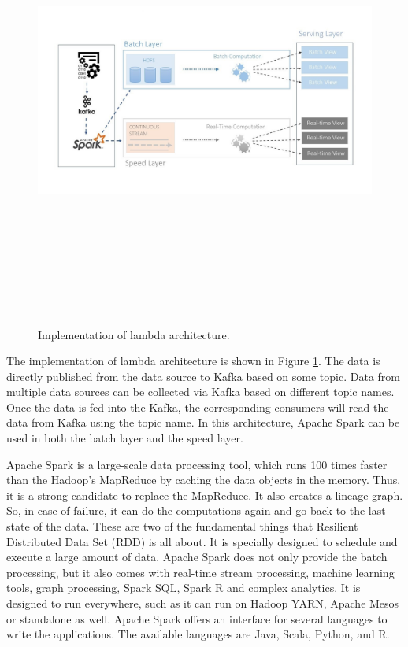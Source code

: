 \begin{figure}[htpb]
	\centering
	\includegraphics[width=17cm,height=15cm,keepaspectratio=true]{images/imp_lambda_arc}
	\caption{
		Implementation of lambda architecture.
	}
	\label{fig:impl_lambda_arc}
\end{figure}


The implementation of lambda architecture is shown in Figure \ref{fig:impl_lambda_arc}. The data is directly published from the data source to Kafka based on some topic. Data from multiple data sources can be collected via Kafka based on different topic names. Once the data is fed into the Kafka, the corresponding consumers will read the data from Kafka using the topic name. In this architecture, Apache Spark can be used in both the batch layer and the speed layer. 

Apache Spark is a large-scale data processing tool, which runs 100 times faster than the Hadoop's MapReduce by caching the data objects in the memory. Thus, it is a strong candidate to replace the MapReduce. It also creates a lineage graph. So, in case of failure, it can do the computations again and go back to the last state of the data. These are two of the fundamental things that Resilient Distributed Data Set (RDD) is all about. It is specially designed to schedule and execute a large amount of data. Apache Spark does not only provide the batch processing, but it also comes with real-time stream processing, machine learning tools, graph processing, Spark SQL, Spark R and complex analytics. It is designed to run everywhere, such as it can run on Hadoop YARN, Apache Mesos or standalone as well. Apache Spark offers an interface for several languages to write the applications. The available languages are Java, Scala, Python, and R.


